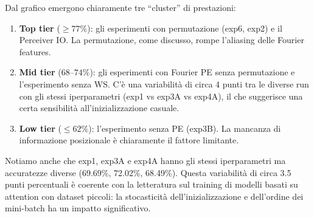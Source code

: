 \documentclass[12pt,a4paper]{article}
\begin{document}
\begin{center}
\end{center}

\begin{notabox}
Dal grafico emergono chiaramente tre ``cluster'' di prestazioni:
\begin{enumerate}[label=(\roman*)]
    \item \textbf{Top tier} ($\geq 77\%$): gli esperimenti con permutazione (exp6, exp2) e il Perceiver IO. La permutazione, come discusso, rompe l'aliasing delle Fourier features.
    \item \textbf{Mid tier} ($68$--$74\%$): gli esperimenti con Fourier PE senza permutazione e l'esperimento senza WS. C'\`e una variabilit\`a di circa 4 punti tra le diverse run con gli stessi iperparametri (exp1 vs exp3A vs exp4A), il che suggerisce una certa sensibilit\`a all'inizializzazione casuale.
    \item \textbf{Low tier} ($\leq 62\%$): l'esperimento senza PE (exp3B). La mancanza di informazione posizionale \`e chiaramente il fattore limitante.
\end{enumerate}
Notiamo anche che exp1, exp3A e exp4A hanno gli stessi iperparametri ma accuratezze diverse (69.69\%, 72.02\%, 68.49\%). Questa variabilit\`a di circa 3.5 punti percentuali \`e coerente con la letteratura sul training di modelli basati su attention con dataset piccoli: la stocasticit\`a dell'inizializzazione e dell'ordine dei mini-batch ha un impatto significativo.
\end{notabox}
\end{document}
